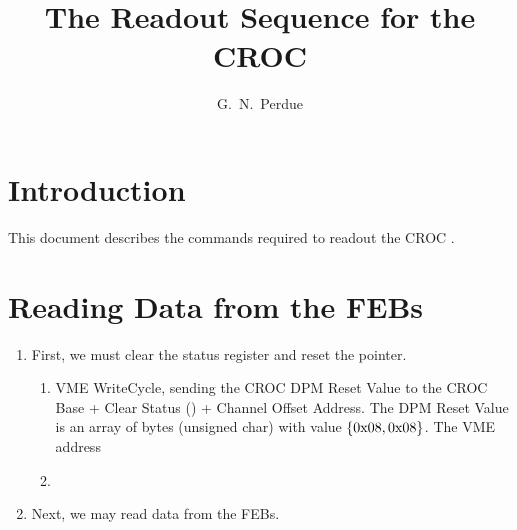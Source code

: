 




\linenumbers

\title{The Readout Sequence for the \minerva CROC}

\author[1]{G.~N.~Perdue}
\affil[1]{\Rochester}

\maketitle


\section{Introduction}
\label{sec:introduction}

This document describes the commands required to readout the \minerva CROC \cite{refcroc}.

\section{Reading Data from the FEBs}
\label{sec:readfromfebs}

\begin{enumerate}
\item First, we must clear the status register and reset the pointer.
\begin{enumerate}
\item VME WriteCycle, sending the CROC DPM Reset Value to the CROC Base + Clear Status () + Channel Offset Address. The DPM Reset Value is an array of bytes (unsigned char) with value $\left\{0\text{x}08,0\text{x}08\right\}$. The VME address 
\item 
\end{enumerate}
\item Next, we may read data from the FEBs.
\end{enumerate}





